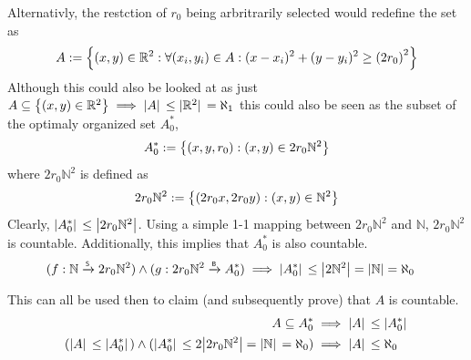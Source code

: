 \documentclass[]{article}
\newcommand{\R}{\mathbb{R}}
\newcommand{\N}{\mathbb{N}}
\newcommand{\toS}{\xrightarrow{\textsf{\tiny S}}}
\newcommand{\toB}{\xrightarrow{\textsf{\tiny B}}}
\begin{document}
Alternativly, the restction of $r_0$ being arbritrarily selected would redefine the set as
\begin{displaymath}
	A := \qty{(x,y) \in \R^2 : \forall (x_i,y_i) \in A : 
			(x - x_i)^2 + (y - y_i)^2 \geq \qty(2r_0)^2}
\end{displaymath}
Although this could also be looked at as just 
$A \subseteq \qty{(x,y) \in \R^2} \implies \abs*{A} \leq \abs*{\R^2} = \aleph_1$
this could also be seen as the subset of the optimaly organized set $A_0^*$,
\begin{displaymath}
	A_0^* := \qty{(x,y,r_0) : (x,y) \in 2 r_0 \N^2}
\end{displaymath}
where $2 r_0 \N^2$ is defined as
\begin{displaymath}
	2 r_0 \N^2 := \qty{(2 r_0 x, 2 r_0 y) : (x,y) \in \N^2}
\end{displaymath}
Clearly, $\abs*{A_0^*} \leq \abs{2 r_0 \N^2}$. 
Using a simple 1-1 mapping between $2 r_0 \N^2$ and $\N$, $2 r_0 \N^2$ is countable. 
Additionally, this implies that $A_0^*$ is also countable.
\begin{align*}
	(f : \N \toS 2 r_0 \N^2) \land (g : 2 r_0 \N^2 \toB A_0^*) 
		&\implies \abs*{A_0^*} \leq \abs{2\N^2} = \abs{\N} = \aleph_0
\end{align*}

This can all be used then to claim (and subsequently prove) that $A$ is countable.
\begin{align*}
	A \subseteq A_0^* &\implies \abs*{A} \leq \abs*{A_0^*}\\
	(\abs*{A} \leq \abs*{A_0^*}) \land (\abs*{A_0^*} \leq 2 \abs{2 r_0 \N^2} 
		= \abs*{\N} = \aleph_0) 
		&\implies \abs*{A} \leq \aleph_0
\end{align*}
\end{document}
